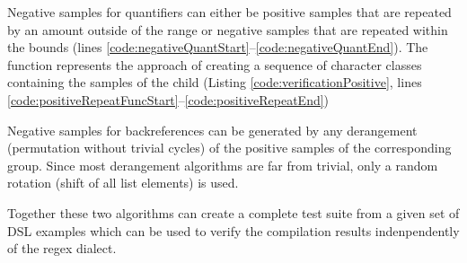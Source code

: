 Negative samples for quantifiers can either be positive samples that are repeated by an amount outside of the range or negative samples that are repeated within the bounds (lines \ref{code:negativeQuantStart}--\ref{code:negativeQuantEnd}). The  function represents the approach of creating a sequence of character classes containing the samples of the child (Listing \ref{code:verificationPositive}, lines \ref{code:positiveRepeatFuncStart}--\ref{code:positiveRepeatEnd})

Negative samples for backreferences can be generated by any derangement (permutation without trivial cycles) of the positive samples of the corresponding group. Since most derangement algorithms are far from trivial, only a random rotation (shift of all list elements) is used.

Together these two algorithms can create a complete test suite from a given set of DSL examples which can be used to verify the compilation results indenpendently of the regex dialect.

